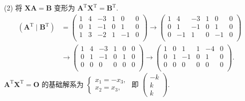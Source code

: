 \documentclass[../../main.tex]{subfiles}%
\begin{document}
\begin{solution}
(2) 将 $\boldsymbol{XA} = \boldsymbol{B}$ 变形为 $\boldsymbol{A}^\mathrm{T}\boldsymbol{X}^\mathrm{T} = \boldsymbol{B}^\mathrm{T}$.
\begin{align*}
\left( \boldsymbol{A}^{\mathrm{T}}\mid \boldsymbol{B}^{\mathrm{T}} \right) &=\left( \begin{matrix}
1&		4&		-3&		1&		0&		0\\
0&		1&		-1&		0&		1&		0\\
1&		3&		-2&		1&		-1&		0\\
\end{matrix} \right) \rightarrow \left( \begin{matrix}
1&		4&		-3&		1&		0&		0\\
0&		1&		-1&		0&		1&		0\\
0&		-1&		1&		0&		-1&		0\\
\end{matrix} \right) 
\\
&\rightarrow \left( \begin{matrix}
1&		4&		-3&		1&		0&		0\\
0&		1&		-1&		0&		1&		0\\
0&		0&		0&		0&		0&		0\\
\end{matrix} \right) \rightarrow \left( \begin{matrix}
1&		0&		1&		1&		-4&		0\\
0&		1&		-1&		0&		1&		0\\
0&		0&		0&		0&		0&		0\\
\end{matrix} \right) .
\end{align*}
$\boldsymbol{A}^\mathrm{T}\boldsymbol{X}^\mathrm{T} = \boldsymbol{O}$ 的基础解系为 $\begin{cases} x_1 = -x_3, \\ x_2 = x_3, \end{cases}$ 即 $\begin{pmatrix} -k \\ k \\ k \end{pmatrix}$.


\end{solution}
\end{document}
